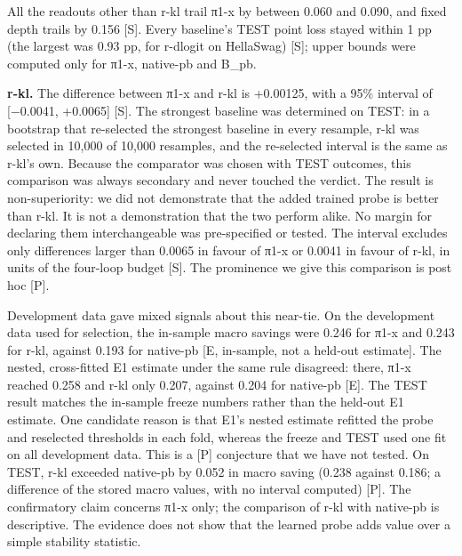All the readouts other than r-kl trail π1-x by between 0.060 and 0.090, and fixed depth trails by 0.156 {[}S{]}. Every baseline's TEST point loss stayed within 1 pp (the largest was 0.93 pp, for r-dlogit on HellaSwag) {[}S{]}; upper bounds were computed only for π1-x, native-pb and B\_pb.

\textbf{r-kl.} The difference between π1-x and r-kl is +0.00125, with a 95\% interval of {[}−0.0041, +0.0065{]} {[}S{]}. The strongest baseline was determined on TEST: in a bootstrap that re-selected the strongest baseline in every resample, r-kl was selected in 10,000 of 10,000 resamples, and the re-selected interval is the same as r-kl's own. Because the comparator was chosen with TEST outcomes, this comparison was always secondary and never touched the verdict. The result is non-superiority: we did not demonstrate that the added trained probe is better than r-kl. It is not a demonstration that the two perform alike. No margin for declaring them interchangeable was pre-specified or tested. The interval excludes only differences larger than 0.0065 in favour of π1-x or 0.0041 in favour of r-kl, in units of the four-loop budget {[}S{]}. The prominence we give this comparison is post hoc {[}P{]}.

Development data gave mixed signals about this near-tie. On the development data used for selection, the in-sample macro savings were 0.246 for π1-x and 0.243 for r-kl, against 0.193 for native-pb {[}E, in-sample, not a held-out estimate{]}. The nested, cross-fitted E1 estimate under the same rule disagreed: there, π1-x reached 0.258 and r-kl only 0.207, against 0.204 for native-pb {[}E{]}. The TEST result matches the in-sample freeze numbers rather than the held-out E1 estimate. One candidate reason is that E1's nested estimate refitted the probe and reselected thresholds in each fold, whereas the freeze and TEST used one fit on all development data. This is a {[}P{]} conjecture that we have not tested. On TEST, r-kl exceeded native-pb by 0.052 in macro saving (0.238 against 0.186; a difference of the stored macro values, with no interval computed) {[}P{]}. The confirmatory claim concerns π1-x only; the comparison of r-kl with native-pb is descriptive. The evidence does not show that the learned probe adds value over a simple stability statistic.

